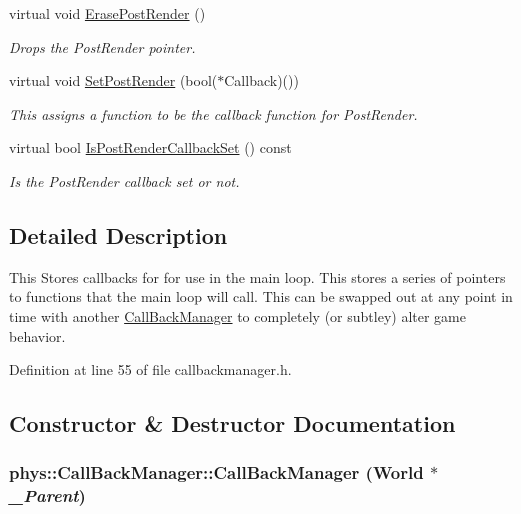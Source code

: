 \begin{DoxyCompactItemize}
virtual void \hyperlink{classphys_1_1CallBackManager_a0eef22a8df4dc87289a18f0e6a1d0baf}{ErasePostRender} ()
\begin{DoxyCompactList}\small\item\em Drops the PostRender pointer. \item\end{DoxyCompactList}\item 
virtual void \hyperlink{classphys_1_1CallBackManager_afe6a91491f3872599d2c5784a902361a}{SetPostRender} (bool($\ast$Callback)())
\begin{DoxyCompactList}\small\item\em This assigns a function to be the callback function for PostRender. \item\end{DoxyCompactList}\item 
virtual bool \hyperlink{classphys_1_1CallBackManager_aab2be377bc741b893e83dc69cadc0f76}{IsPostRenderCallbackSet} () const 
\begin{DoxyCompactList}\small\item\em Is the PostRender callback set or not. \item\end{DoxyCompactList}\end{DoxyCompactItemize}


\subsection{Detailed Description}
This Stores callbacks for for use in the main loop. This stores a series of pointers to functions that the main loop will call. This can be swapped out at any point in time with another \hyperlink{classphys_1_1CallBackManager}{CallBackManager} to completely (or subtley) alter game behavior. 

Definition at line 55 of file callbackmanager.h.



\subsection{Constructor \& Destructor Documentation}
\hypertarget{classphys_1_1CallBackManager_a16d4c60beef774ae904cf01853d71aae}{
\subsubsection[{CallBackManager}]{\setlength{\rightskip}{0pt plus 5cm}phys::CallBackManager::CallBackManager ({\bf World} $\ast$ {\em \_\-Parent})}}
\label{d1/d47/classphys_1_1CallBackManager_a16d4c60beef774ae904cf01853d71aae}


